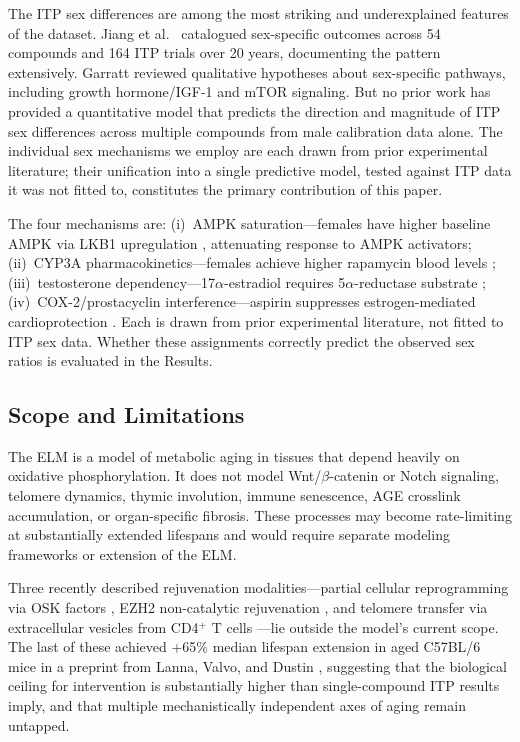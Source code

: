 \documentclass[11pt]{article}
\begin{document}
The ITP sex differences are among the most striking and underexplained features of the dataset. Jiang et al.\ \citep{Jiang2025} catalogued sex-specific outcomes across 54 compounds and 164 ITP trials over 20 years, documenting the pattern extensively. Garratt \citep{Garratt2020} reviewed qualitative hypotheses about sex-specific pathways, including growth hormone/IGF-1 and mTOR signaling. But no prior work has provided a quantitative model that predicts the direction and magnitude of ITP sex differences across multiple compounds from male calibration data alone. The individual sex mechanisms we employ are each drawn from prior experimental literature; their unification into a single predictive model, tested against ITP data it was not fitted to, constitutes the primary contribution of this paper.

The four mechanisms are: (i)~AMPK saturation---females have higher baseline AMPK via LKB1 upregulation \citep{Boudaba2018,McInnes2011}, attenuating response to AMPK activators; (ii)~CYP3A pharmacokinetics---females achieve higher rapamycin blood levels \citep{Lamming2014}; (iii)~testosterone dependency---17$\alpha$-estradiol requires 5$\alpha$-reductase substrate \citep{Garratt2018}; (iv)~COX-2/prostacyclin interference---aspirin suppresses estrogen-mediated cardioprotection \citep{Egan2004,Grosser2006}. Each is drawn from prior experimental literature, not fitted to ITP sex data. Whether these assignments correctly predict the observed sex ratios is evaluated in the Results.

\subsection{Scope and Limitations}

The ELM is a model of metabolic aging in tissues that depend heavily on oxidative phosphorylation. It does not model Wnt/$\beta$-catenin or Notch signaling, telomere dynamics, thymic involution, immune senescence, AGE crosslink accumulation, or organ-specific fibrosis. These processes may become rate-limiting at substantially extended lifespans and would require separate modeling frameworks or extension of the ELM.

Three recently described rejuvenation modalities---partial cellular reprogramming via OSK factors \citep{Ocampo2016}, EZH2 non-catalytic rejuvenation \citep{Liao2024}, and telomere transfer via extracellular vesicles from CD4$^+$ T cells \citep{Lanna2025}---lie outside the model's current scope. The last of these achieved +65\% median lifespan extension in aged C57BL/6 mice in a preprint from Lanna, Valvo, and Dustin \citep{Lanna2025}, suggesting that the biological ceiling for intervention is substantially higher than single-compound ITP results imply, and that multiple mechanistically independent axes of aging remain untapped.
\end{document}
